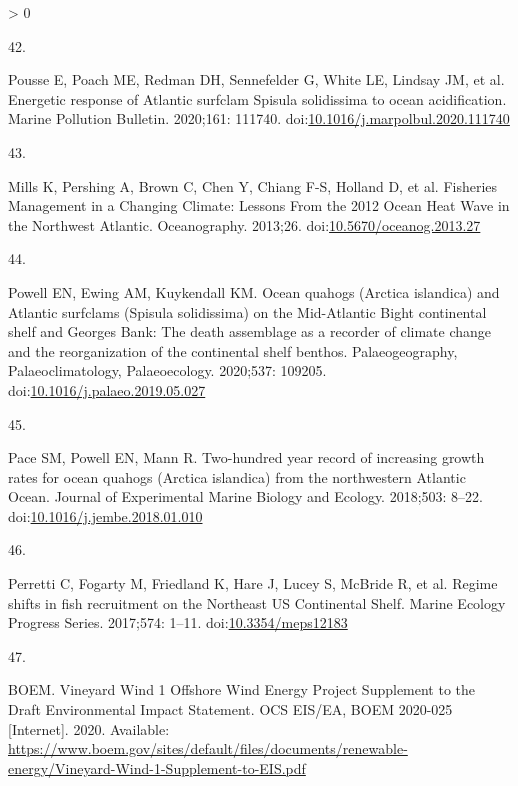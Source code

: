 \documentclass[
  10pt,
]{article}
\newlength{\cslhangindent}
\newlength{\csllabelwidth}
\newenvironment{CSLReferences}[2] %
 {%
  \setlength{\parindent}{0pt}
  \ifodd #1 \everypar{\setlength{\hangindent}{\cslhangindent}}\ignorespaces\fi
  \ifnum #2 > 0
  \setlength{\parskip}{#2\baselineskip}
  \fi
 }%
 {}
\newcommand{\CSLLeftMargin}[1]{\parbox[t]{\csllabelwidth}{#1}}
\newcommand{\CSLRightInline}[1]{\parbox[t]{\linewidth - \csllabelwidth}{#1}\break}
\begin{document}
\begin{CSLReferences}{0}{0}
\leavevmode\hypertarget{ref-pousse_energetic_2020}{}%
\CSLLeftMargin{42. }
\CSLRightInline{Pousse E, Poach ME, Redman DH, Sennefelder G, White LE,
Lindsay JM, et al. Energetic response of {Atlantic} surfclam {Spisula}
solidissima to ocean acidification. Marine Pollution Bulletin. 2020;161:
111740.
doi:\href{https://doi.org/10.1016/j.marpolbul.2020.111740}{10.1016/j.marpolbul.2020.111740}}

\leavevmode\hypertarget{ref-mills_fisheries_2013}{}%
\CSLLeftMargin{43. }
\CSLRightInline{Mills K, Pershing A, Brown C, Chen Y, Chiang F-S,
Holland D, et al. Fisheries {Management} in a {Changing} {Climate}:
{Lessons} {From} the 2012 {Ocean} {Heat} {Wave} in the {Northwest}
{Atlantic}. Oceanography. 2013;26.
doi:\href{https://doi.org/10.5670/oceanog.2013.27}{10.5670/oceanog.2013.27}}

\leavevmode\hypertarget{ref-powell_ocean_2020}{}%
\CSLLeftMargin{44. }
\CSLRightInline{Powell EN, Ewing AM, Kuykendall KM. Ocean quahogs
({Arctica} islandica) and {Atlantic} surfclams ({Spisula} solidissima)
on the {Mid}-{Atlantic} {Bight} continental shelf and {Georges} {Bank}:
{The} death assemblage as a recorder of climate change and the
reorganization of the continental shelf benthos. Palaeogeography,
Palaeoclimatology, Palaeoecology. 2020;537: 109205.
doi:\href{https://doi.org/10.1016/j.palaeo.2019.05.027}{10.1016/j.palaeo.2019.05.027}}

\leavevmode\hypertarget{ref-pace_two-hundred_2018}{}%
\CSLLeftMargin{45. }
\CSLRightInline{Pace SM, Powell EN, Mann R. Two-hundred year record of
increasing growth rates for ocean quahogs ({Arctica} islandica) from the
northwestern {Atlantic} {Ocean}. Journal of Experimental Marine Biology
and Ecology. 2018;503: 8--22.
doi:\href{https://doi.org/10.1016/j.jembe.2018.01.010}{10.1016/j.jembe.2018.01.010}}

\leavevmode\hypertarget{ref-perretti_regime_2017}{}%
\CSLLeftMargin{46. }
\CSLRightInline{Perretti C, Fogarty M, Friedland K, Hare J, Lucey S,
McBride R, et al. Regime shifts in fish recruitment on the {Northeast}
{US} {Continental} {Shelf}. Marine Ecology Progress Series. 2017;574:
1--11. doi:\href{https://doi.org/10.3354/meps12183}{10.3354/meps12183}}

\leavevmode\hypertarget{ref-boem_vineyard_2020}{}%
\CSLLeftMargin{47. }
\CSLRightInline{BOEM. Vineyard {Wind} 1 {Offshore} {Wind} {Energy}
{Project} {Supplement} to the {Draft} {Environmental} {Impact}
{Statement}. {OCS} {EIS}/{EA}, {BOEM} 2020-025 {[}Internet{]}. 2020.
Available:
\url{https://www.boem.gov/sites/default/files/documents/renewable-energy/Vineyard-Wind-1-Supplement-to-EIS.pdf}}

\end{CSLReferences}
\end{document}
